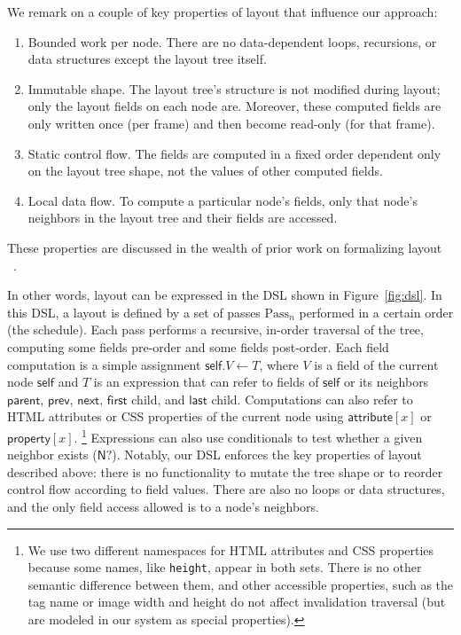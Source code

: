 We remark on a couple of key properties of layout
  that influence our approach:
\begin{enumerate}
\item Bounded work per node. There are no
  data-dependent loops, recursions, or data structures
  except the layout tree itself.
\item Immutable shape. The layout tree's structure
  is not modified during layout;
  only the layout fields on each node are.
Moreover, these computed fields
  are only written once (per frame)
  and then become read-only (for that frame).
\item Static control flow.
  The fields are computed in a fixed order
    dependent only on the layout tree shape,
    not the values of other computed fields.
\item Local data flow.
  To compute a particular node's fields,
    only that node's neighbors in the layout tree
    and their fields are accessed.
\end{enumerate}
These properties are discussed in
  the wealth of prior work on formalizing layout%
  ~\cite{meyerovich-1,meyerovich-2,meyerovich-3,cassius-1,cassius-2,cassius-3,yufeng-1,yufeng-2}.

In other words, layout can be expressed in the DSL
  shown in Figure~\ref{fig:dsl}.
In this DSL, a layout is defined by a set of passes
  $\text{Pass}_n$ performed in a certain order (the schedule).
Each pass performs a recursive, in-order traversal of the tree,
  computing some fields pre-order and some fields post-order.
Each field computation is a simple assignment $\mathsf{self}.V \gets T$,
  where $V$ is a field of the current node $\mathsf{self}$
  and $T$ is an expression that can refer to
  fields of $\mathsf{self}$ or its neighbors
  $\mathsf{parent}$, $\mathsf{prev}$, $\mathsf{next}$,
  $\mathsf{first}$ child, and $\mathsf{last}$ child.
Computations can also refer to HTML attributes or CSS properties
  of the current node
  using $\mathsf{attribute}[x]$ or $\mathsf{property}[x]$.%
\footnote{
We use two different namespaces
  for HTML attributes and CSS properties
  because some names, like \texttt{height},
  appear in both sets.
There is no other semantic difference between them,
  and other accessible properties,
  such as the tag name or image width and height
  do not affect invalidation traversal
  (but are modeled in our system as special properties).
}
Expressions can also use conditionals
  to test whether a given neighbor exists ($\mathsf{N?}$).
Notably, our DSL enforces
  the key properties of layout described above:
  there is no functionality to mutate the tree shape
  or to reorder control flow according to field values.
There are also no loops or data structures,
  and the only field access allowed is to a node's neighbors.

